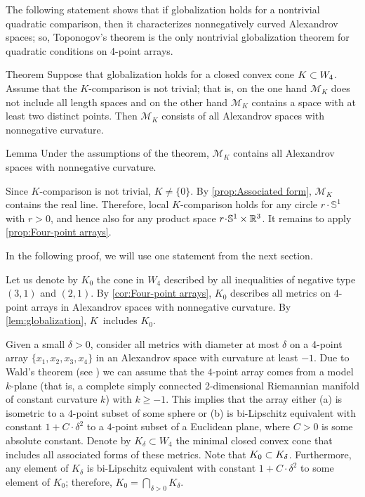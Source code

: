 The following statement shows that if globalization holds for a nontrivial quadratic comparison, then it characterizes nonnegatively curved Alexandrov spaces;
so, Toponogov's theorem is the only nontrivial globalization theorem for quadratic conditions on 4-point arrays.

\begin{thm}{Theorem}\label{thm:globalization}
Suppose that globalization holds for a closed convex cone $K\z\subset W_4$.
Assume that the $K$-comparison is not trivial;
that is, on the one hand $\mathcal{M}_K$ does not include all length spaces and on the other hand $\mathcal{M}_K$ contains a space with at least two distinct points.
Then $\mathcal{M}_K$ consists of all Alexandrov spaces with nonnegative curvature.
\end{thm}

\begin{thm}{Lemma}\label{lem:globalization}
Under the assumptions of the theorem, $\mathcal{M}_K$ contains all Alexandrov spaces with nonnegative curvature.
\end{thm}

Since $K$-comparison is not trivial, $K\ne\{0\}$.
By \ref{prop:Associated form}, $\mathcal{M}_K$ contains the real line.
Therefore, local $K$-comparison holds
for any circle $r\cdot \mathbb{S}^1$ with $r>0$, and hence also for any product space $r\cdot \mathbb{S}^1\times\RR^3$.
It remains to apply \ref{prop:Four-point arrays}.
\qeds

In the following proof, we will use one statement from the next section.

Let us denote by $K_0$ the cone in $W_4$ described by all inequalities of negative type $(3,1)$ and $(2,1)$.
By \ref{cor:Four-point arrays}, $K_0$ describes all metrics on 4-point arrays in Alexandrov spaces with nonnegative curvature.
By \ref{lem:globalization},  $K$~includes $K_0$.

Given a small $\delta>0$, consider all metrics with diameter at most $\delta$ on a 4-point array $\{x_1,x_2,x_3,x_4\}$ in an Alexandrov space with curvature at least $-1$.
Due to Wald's theorem (see \cite[Exercise 10.7]{AKP-2024}) we can assume that the $4$-point array
comes from a model $k$-plane (that is, a complete simply connected 2-dimensional Riemannian manifold of constant curvature $k$) with $k \geqslant -1$.
This implies that the array either (a) is isometric to a $4$-point subset of some sphere or (b) is bi-Lipschitz equivalent with constant $1 + C\cdot \delta^2$ to a $4$-point subset of a Euclidean plane, where $C > 0$ is some absolute constant.
Denote by $K_\delta\subset W_4$ the minimal closed convex cone that includes all associated forms of these metrics.
Note that $K_0\z\subset K_\delta$.
Furthermore, %
any element of $K_\delta$ is bi-Lipschitz equivalent with constant $1 + C \cdot\delta^2$ to some element of $K_0$;
therefore, $K_0=\bigcap_{\delta>0} K_\delta$.


